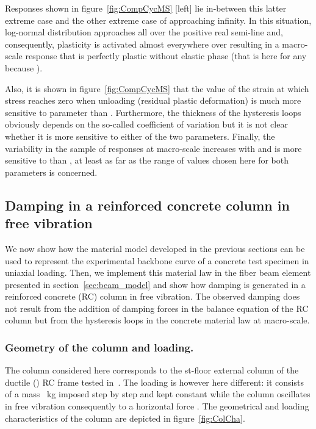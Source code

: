 \documentclass[12p]{amsart}
\begin{document}
Responses shown in figure~\ref{fig:CompCycMS} [left] lie in-between this latter extreme case and the other extreme case of  approaching infinity. In this situation, log-normal distribution approaches  all over the positive real semi-line and, consequently, plasticity is activated almost everywhere over  resulting in a macro-scale response that is perfectly plastic without elastic phase (that is here  for any  because ).

Also, it is shown in figure~\ref{fig:CompCycMS} that the value of the strain  at which stress  reaches zero when unloading (residual plastic deformation) is much more sensitive to parameter  than . Furthermore, the thickness of the hysteresis loops obviously depends on the so-called coefficient of variation  but it is not clear whether it is more sensitive to either of the two parameters. Finally, the variability in the sample of responses at macro-scale increases with  and is more sensitive to  than , at least as far as the range of values chosen here for both parameters is concerned.


\subsection{Damping in a reinforced concrete column in free vibration} \label{sec:NA-RC}

We now show how the material model developed in the previous sections can be used to represent the experimental backbone curve of a concrete test specimen in uniaxial loading. Then, we implement this material law in the fiber beam element presented in section~\ref{sec:beam_model} and show how damping is generated in a reinforced concrete (RC) column in free vibration. The observed damping does not result from the addition of damping forces in the balance equation of the RC column but from the hysteresis loops in the concrete material law at macro-scale.


\subsubsection{Geometry of the column and loading.}\label{sec:GeoLoa}

The column considered here corresponds to the st-floor external column of the ductile () RC frame tested in~\cite{FilLacLam1998a,Lamontagne1997}. The loading is however here different: it consists of a mass ~kg imposed step by step and kept constant while the column oscillates in free vibration consequently to a horizontal force . The geometrical and loading characteristics of the column are depicted in figure~\ref{fig:ColCha}.
\end{document}
